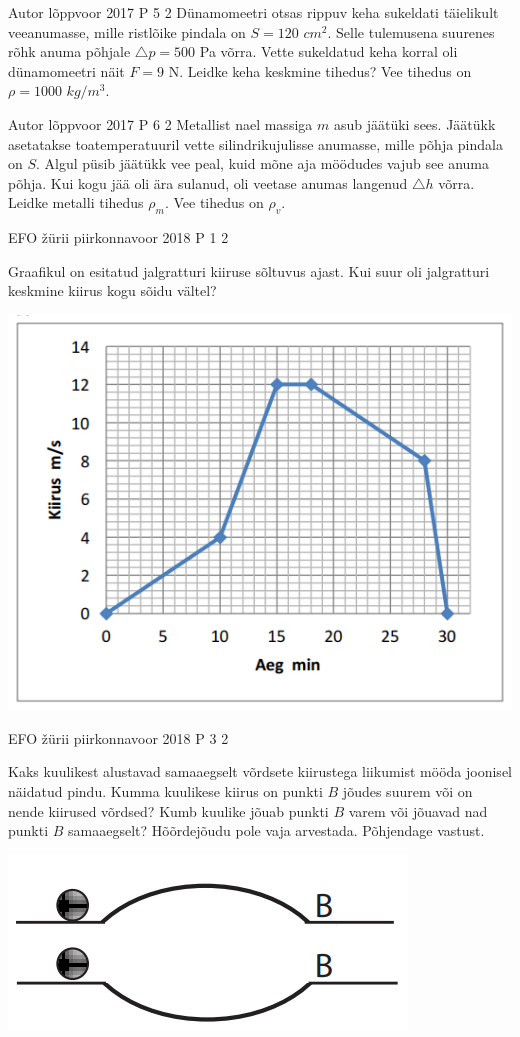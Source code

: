 \documentclass[11pt]{article}
\begin{document}
{%
{Autor} %
{lõppvoor} %
{2017} %
{P 5} %
{2} %
{
\ifStatement
Dünamomeetri otsas rippuv keha sukeldati täielikult veeanumasse, mille ristlõike pindala on $S = 120$ $cm^2$. Selle tulemusena suurenes rõhk anuma põhjale $\triangle p = 500$ Pa võrra. Vette sukeldatud keha korral oli dünamomeetri näit $F = 9$ N. Leidke keha keskmine tihedus? Vee tihedus on $\rho = 1000$ $kg/m^3$.
\fi
}


{Autor} %
{lõppvoor} %
{2017} %
{P 6} %
{2} %
{
\ifStatement
Metallist nael massiga $m$ asub jäätüki sees. Jäätükk asetatakse toatemperatuuril vette silindrikujulisse anumasse, mille põhja pindala on $S$. Algul püsib jäätükk vee peal, kuid mõne aja möödudes vajub see anuma põhja. Kui kogu jää oli ära sulanud, oli veetase anumas langenud $\triangle h$ võrra. Leidke metalli tihedus $\rho _m$. Vee tihedus on $\rho_v$.
\fi
}

{EFO žürii} %
{piirkonnavoor} %
{2018} %
{P 1} %
{2} %
{
\ifStatement
Graafikul on esitatud jalgratturi kiiruse sõltuvus ajast. Kui suur oli jalgratturi keskmine kiirus kogu sõidu vältel?
\begin{center}
	\includegraphics[width=0.5\linewidth]{2018-v2p-01-yl.PNG}
\end{center}
\fi
}


{EFO žürii} %
{piirkonnavoor} %
{2018} %
{P 3} %
{2} %
{
\ifStatement
Kaks kuulikest alustavad samaaegselt võrdsete kiirustega liikumist mööda joonisel näidatud pindu. Kumma kuulikese kiirus on punkti $B$ jõudes suurem või on nende kiirused võrdsed? Kumb kuulike jõuab punkti $B$ varem või jõuavad nad punkti $B$ samaaegselt? Hõõrdejõudu pole vaja arvestada. Põhjendage vastust.
\begin{center}
	\includegraphics[width=0.5\linewidth]{2018-v2p-03-yl.PNG}
\end{center}
\fi
}


}
\end{document}
